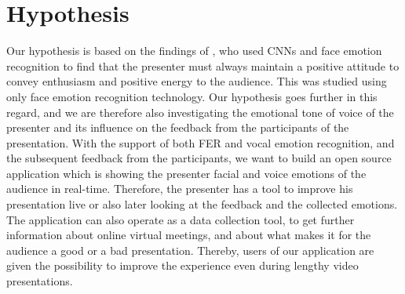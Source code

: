 \section{Hypothesis}
\label{sec:hypothesis}
Our hypothesis is based on the findings of , who used CNNs and face emotion recognition to find that the presenter must always maintain a positive attitude to convey enthusiasm and positive energy to the audience. This was studied using only face emotion recognition technology. Our hypothesis goes further in this regard, and we are therefore also investigating the emotional tone of voice of the presenter and its influence on the feedback from the participants of the presentation. With the support of both FER and vocal emotion recognition, and the subsequent feedback from the participants, we want to build an open source application which is showing the presenter facial and voice emotions of the audience in real-time. Therefore, the presenter has a tool to improve his presentation live or also later looking at the feedback and the collected emotions. The application can also operate as a data collection tool, to get further information about online virtual meetings, and about what makes it for the audience a good or a bad presentation. Thereby, users of our application are given the possibility to improve the experience even during lengthy video presentations.
